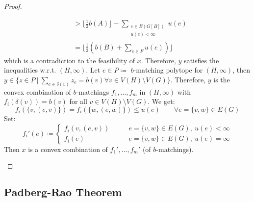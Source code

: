\documentclass[11pt, a4paper]{article}
\newcommand{\floor}[1]{\lfloor #1 \rfloor}
\newcommand{\set}[1]{\{#1\}}
\theoremstyle{remark}
\theoremstyle{definition}
\begin{document}
\begin{proof}
\begin{enumerate}
\begin{align*}
			                & > \floor{\frac{1}{2}b(A)}-\sum_{\substack{e\in E(G[B]) \\ u(e)<\infty}}u(e) \\
			                & =\floor{\frac{1}{2}(b(B)+\sum_{e\in F}u(e))}
		\end{align*}
		which is a contradiction to the feasibility of $x$. Therefore, $y$
		satisfies the inequalities w.r.t. $(H,\infty)$. Let
		$e\in P\coloneqq $ $b$-matching polytope for $(H,\infty)$, then
		$y\in \set{z\in P\ |\ \sum_{e\in\delta(v)}z_e=b(v) \forall v\in V(H)\setminus V(G)}$.
		Therefore, $y$ is the convex combination of $b$-matchings $f_1,\ldots,f_m$
		in $(H,\infty)$ with $f_i(\delta(v))=b(v)$ for all $v\in V(H)\setminus V(G)$.
		We get:
		\[f_i(\set{v,(e,v)})=f_i(\set{w,(e,w)})\leq u(e) \qquad \forall e=\set{v,w}\in E(G)\]
		Set:
		\[f_i'(e)\coloneqq\begin{cases}
				f_i(v,(e,v)) \qquad & e=\set{v,w}\in E(G),\ u(e)<\infty \\
				f_i(e) \qquad       & e=\set{v,w}\in E(G),\ u(e)=\infty
			\end{cases}\]
		Then $x$ is a convex combination of $f_1',\ldots,f_m'$ (of
		$b$-matchings).
	\end{enumerate}
\end{proof}


\subsection{Padberg-Rao Theorem}
\end{document}
